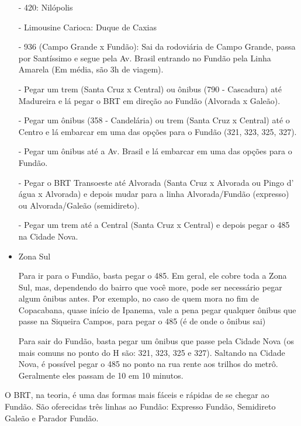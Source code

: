 \begin{itemize}
        - 420: Nilópolis
            
        - Limousine Carioca: Duque de Caxias
        
        - 936  (Campo Grande x Fundão): Sai da rodoviária de Campo Grande, passa por Santíssimo e segue pela Av. Brasil entrando no Fundão pela Linha Amarela (Em média, são 3h de viagem).
                 
 		- Pegar um trem (Santa Cruz x Central) ou ônibus (790 - Cascadura) até Madureira e lá pegar o BRT em direção ao Fundão (Alvorada x Galeão).
        
 		- Pegar um ônibus (358 - Candelária) ou trem (Santa Cruz x Central) até o Centro e lá embarcar em uma das opções para o Fundão (321, 323, 325, 327).
        
		- Pegar um ônibus até a Av. Brasil e lá embarcar em uma das opções para o Fundão.
        
 		- Pegar o BRT Transoeste até Alvorada (Santa Cruz x Alvorada ou Pingo d’ água x Alvorada) e depois mudar para a linha Alvorada/Fundão (expresso) ou Alvorada/Galeão (semidireto).
        
		- Pegar um trem até a Central (Santa Cruz x Central) e depois pegar o 485 na Cidade Nova.

        \item Zona Sul
        
        Para ir para o Fundão, basta pegar o 485. Em geral, ele cobre toda a Zona Sul, mas, dependendo do bairro que você more, pode ser necessário pegar algum ônibus antes. Por exemplo, no caso de quem mora no fim de Copacabana, quase início de Ipanema, vale a pena pegar qualquer ônibus que passe na Siqueira Campos, para pegar o 485 (é de onde o ônibus sai)
        
        Para sair do Fundão, basta pegar um ônibus que passe pela Cidade Nova (os mais comuns no ponto do H são: 321, 323, 325 e 327). Saltando na Cidade Nova, é possível pegar o 485 no ponto na rua rente aos trilhos do metrô. Geralmente eles passam de 10 em 10 minutos.

        
    \end{itemize}
    
        O BRT, na teoria, é uma das formas mais fáceis e rápidas de se chegar ao Fundão. São oferecidas três linhas ao Fundão: Expresso Fundão, Semidireto Galeão e Parador Fundão.
        
